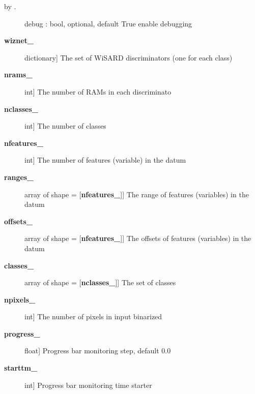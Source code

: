 \documentclass[letterpaper,10pt,english]{sphinxmanual}
\begin{document}
\begin{fulllineitems}
\begin{description}
\item[{by .}] \leavevmode
debug : bool, optional, default True
enable debugging

\end{description}
\begin{description}
\item[{{\color{red}\bfseries{}wiznet\_}}] \leavevmode{[}dictionary{]}
The set of WiSARD discriminators (one for each class)

\item[{{\color{red}\bfseries{}nrams\_}}] \leavevmode{[}int{]}
The number of RAMs in each discriminato

\item[{{\color{red}\bfseries{}nclasses\_}}] \leavevmode{[}int{]}
The number of classes

\item[{{\color{red}\bfseries{}nfeatures\_}}] \leavevmode{[}int{]}
The number of features (variable) in the datum

\item[{{\color{red}\bfseries{}ranges\_}}] \leavevmode{[}array of shape = {[}{\color{red}\bfseries{}nfeatures\_}{]}{]}
The range of features (variables) in the datum

\item[{{\color{red}\bfseries{}offsets\_}}] \leavevmode{[}array of shape = {[}{\color{red}\bfseries{}nfeatures\_}{]}{]}
The offsets of features (variables) in the datum

\item[{{\color{red}\bfseries{}classes\_}}] \leavevmode{[}array of shape = {[}{\color{red}\bfseries{}nclasses\_}{]}{]}
The set of classes

\item[{{\color{red}\bfseries{}npixels\_}}] \leavevmode{[}int{]}
The number of pixels in input binarized

\item[{{\color{red}\bfseries{}progress\_}}] \leavevmode{[}float{]}
Progress bar monitoring step, default 0.0

\item[{{\color{red}\bfseries{}starttm\_}}] \leavevmode{[}int{]}
Progress bar monitoring time starter

\end{description}


\end{fulllineitems}
\end{document}
